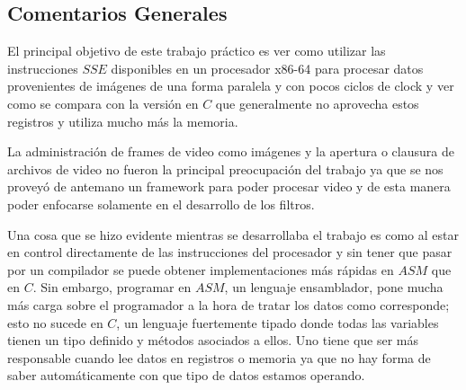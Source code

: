 \subsection{Comentarios Generales}
	
	El principal objetivo de este trabajo pr\'actico es ver como utilizar las instrucciones $SSE$ disponibles en un procesador x86-64 para procesar datos provenientes de im\'agenes de una forma paralela y con pocos ciclos de clock y ver como se compara con la versi\'on en $C$ que generalmente no aprovecha estos registros y utiliza mucho m\'as la memoria.
	
	La administraci\'on de frames de video como im\'agenes y la apertura o clausura de archivos de video no fueron la principal preocupaci\'on del trabajo ya que se nos provey\'o de antemano un framework para poder procesar video y de esta manera poder enfocarse solamente en el desarrollo de los filtros. 
	
	Una cosa que se hizo evidente mientras se desarrollaba el trabajo es como al estar en control directamente de las instrucciones del procesador y sin tener que pasar por un compilador se puede obtener implementaciones m\'as r\'apidas en $ASM$ que en $C$. Sin embargo, programar en $ASM$, un lenguaje ensamblador, pone mucha m\'as carga sobre el programador a la hora de tratar los datos como corresponde; esto no sucede en $C$, un lenguaje fuertemente tipado donde todas las variables tienen un tipo definido y m\'etodos asociados a ellos. Uno tiene que ser m\'as responsable cuando lee datos en registros o memoria ya que no hay forma de saber autom\'aticamente con que tipo de datos estamos operando.
